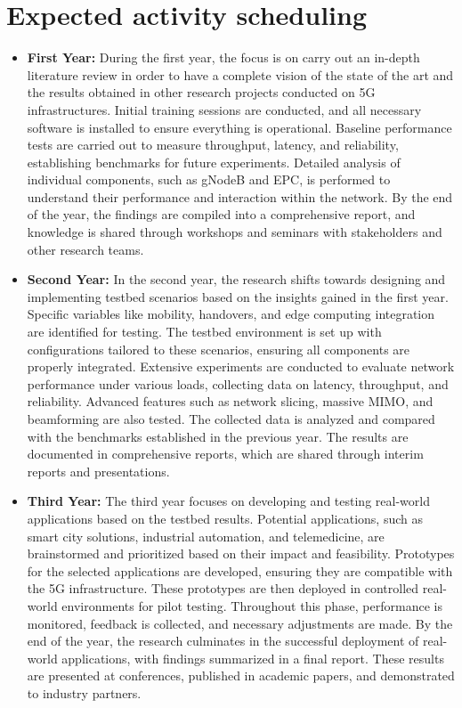 \documentclass{report}
\begin{document}
\section*{Expected activity scheduling}
\begin{itemize}
	\item \textbf{First Year:} During the first year, the focus is on carry out an in-depth literature review in order to have a complete vision of the state of the art and the results obtained in other research projects conducted on 5G infrastructures. Initial training sessions are conducted, and all necessary software is installed to ensure everything is operational. Baseline performance tests are carried out to measure throughput, latency, and reliability, establishing benchmarks for future experiments. Detailed analysis of individual components, such as gNodeB and EPC, is performed to understand their performance and interaction within the network. By the end of the year, the findings are compiled into a comprehensive report, and knowledge is shared through workshops and seminars with stakeholders and other research teams.
	\item \textbf{Second Year:} In the second year, the research shifts towards designing and implementing testbed scenarios based on the insights gained in the first year. Specific variables like mobility, handovers, and edge computing integration are identified for testing. The testbed environment is set up with configurations tailored to these scenarios, ensuring all components are properly integrated. Extensive experiments are conducted to evaluate network performance under various loads, collecting data on latency, throughput, and reliability. Advanced features such as network slicing, massive MIMO, and beamforming are also tested. The collected data is analyzed and compared with the benchmarks established in the previous year. The results are documented in comprehensive reports, which are shared through interim reports and presentations.
	\item \textbf{Third Year:} The third year focuses on developing and testing real-world applications based on the testbed results. Potential applications, such as smart city solutions, industrial automation, and telemedicine, are brainstormed and prioritized based on their impact and feasibility. Prototypes for the selected applications are developed, ensuring they are compatible with the 5G infrastructure. These prototypes are then deployed in controlled real-world environments for pilot testing. Throughout this phase, performance is monitored, feedback is collected, and necessary adjustments are made. By the end of the year, the research culminates in the successful deployment of real-world applications, with findings summarized in a final report. These results are presented at conferences, published in academic papers, and demonstrated to industry partners.
\end{itemize}
\end{document}

